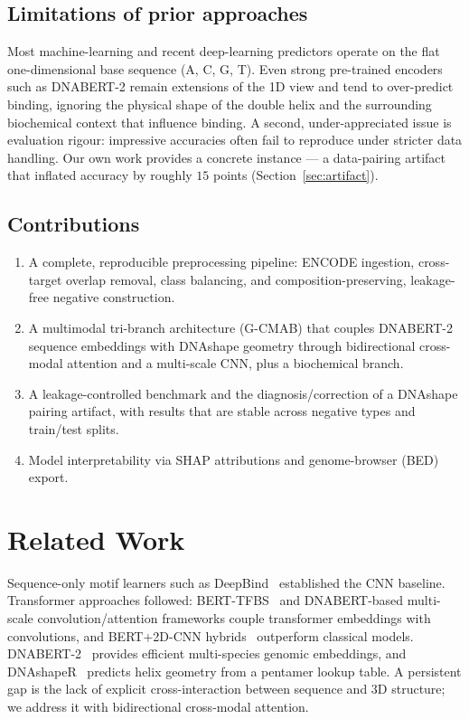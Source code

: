 \documentclass[11pt]{article}
\begin{document}
\subsection{Limitations of prior approaches}
Most machine-learning and recent deep-learning predictors operate on the flat
one-dimensional base sequence (A, C, G, T). Even strong pre-trained encoders such as
DNABERT-2 remain extensions of the 1D view and tend to over-predict binding,
ignoring the physical shape of the double helix and the surrounding biochemical
context that influence binding. A second, under-appreciated issue is evaluation
rigour: impressive accuracies often fail to reproduce under stricter data handling.
Our own work provides a concrete instance --- a data-pairing artifact that inflated
accuracy by roughly $15$ points (Section~\ref{sec:artifact}).

\subsection{Contributions}
\begin{enumerate}
  \item A complete, reproducible preprocessing pipeline: ENCODE ingestion,
        cross-target overlap removal, class balancing, and composition-preserving,
        leakage-free negative construction.
  \item A multimodal tri-branch architecture (G-CMAB) that couples DNABERT-2 sequence
        embeddings with DNAshape geometry through bidirectional cross-modal attention
        and a multi-scale CNN, plus a biochemical branch.
  \item A leakage-controlled benchmark and the diagnosis/correction of a DNAshape
        pairing artifact, with results that are stable across negative types and
        train/test splits.
  \item Model interpretability via SHAP attributions and genome-browser (BED) export.
\end{enumerate}

\section{Related Work}
Sequence-only motif learners such as DeepBind~\cite{deepbind} established the CNN
baseline. Transformer approaches followed: BERT-TFBS~\cite{berttfbs} and
DNABERT-based multi-scale convolution/attention frameworks couple transformer
embeddings with convolutions, and BERT+2D-CNN hybrids~\cite{le} outperform classical
models. DNABERT-2~\cite{dnabert2} provides efficient multi-species genomic
embeddings, and DNAshapeR~\cite{dnashaper} predicts helix geometry from a
pentamer lookup table. A persistent gap is the lack of explicit cross-interaction
between sequence and 3D structure; we address it with bidirectional cross-modal
attention.
\end{document}
